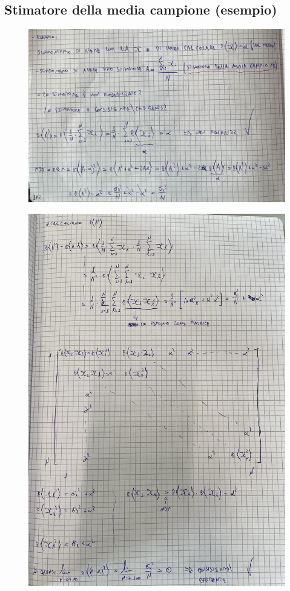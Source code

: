 \documentclass{article}
\begin{document}
\subsection{Stimatore della media campione (esempio)}
\begin{figure}[H]
\centering
\includegraphics[scale=0.16]{ese/53.jpeg}
\end{figure}
\begin{figure}[H]
\centering
\includegraphics[scale=0.16]{ese/53a.jpeg}
\end{figure}
\end{document}
